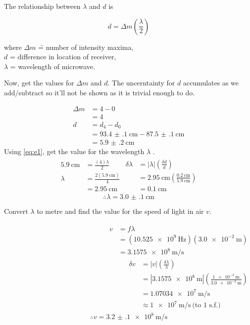 \documentclass[letter,12pt]{article}
\newcommand{\tlambda}{\(\lambda\) }
\numberwithin{equation}{section}
\numberwithin{figure}{section}
\numberwithin{table}{section}
\begin{document}
The relationship between \tlambda and \(d\) is

\begin{equation} \label{eq:e1}
  d = \Delta m \left( \frac{\lambda}{2} \right)
\end{equation}

\begin{tabbing}
  where \= \(\Delta m\) \= = number of intensity maxima, \\
  \> \(d\) \> = difference in location of receiver, \\
  \> \tlambda \> = wavelength of microwave.
\end{tabbing}

Now, get the values for \(\Delta m\) and \(d\). The uncerntainty for \(d\) accumulates as we add/subtract so it'll not be shown as it is trivial enough to do.

\begin{align*}
  \Delta m &= 4 - 0 \\
  &= 4 \\
  d &= d_4 - d_0 \\
  &= \SI{93.4(1)}{\cm} - \SI{87.5(1)}{\cm} \\
  &= \SI{5.9(2)}{\cm}
\end{align*}
Using \eqref{eq:e1}, get the value for the wavelength \tlambda.
\begin{align*}
  \begin{split}
    \SI{5.9}{\cm} &= \frac{(4) \lambda}{2} \\
    \lambda &= \frac{2(\SI{5.9}{\cm})}{4} \\
    &= \SI{2.95}{\cm}
  \end{split}
  \begin{split}
    \delta \lambda &= |\lambda|\left( \frac{\delta d}{d} \right) \\
    &= \SI{2.95}{\cm} \left( \frac{\SI{0.2}{\cm}}{\SI{5.9}{\cm}} \right) \\
    &= \SI{0.1}{\cm}
  \end{split}
\end{align*}
\[\therefore \lambda = \SI{3.0(1)}{\cm}\]

Convert \tlambda to metre and find the value for the speed of light in air \(v\).

\begin{align*}
  \begin{split}
    v &= f \lambda \\
    &= (\SI{10.525e9}{\hertz})(\SI{3.0e-2}{\m}) \\
    &= \SI{3.1575e8}{\m\per\s}
  \end{split}
  \begin{split}
    \delta v &= |v| \left( \frac{\delta \lambda}{\lambda} \right) \\
    &= |\SI{3.1575e8}{\m}| \left( \frac{\SI{1e-3}{\m}}{\SI{3.0e-2}{\m}} \right) \\
    &= \SI{1.07034e7}{\m\per\s} \\
    &\approx \SI{1e7}{\m\per\s} \ \text{(to 1 s.f.)}
  \end{split}
\end{align*}
\[\therefore v = \SI{3.2(1)e8}{\m\per\s}\]
\end{document}
